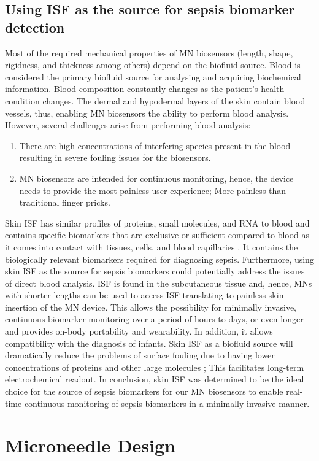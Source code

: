 \begin{appendices}
\subsection{Using ISF as the source for sepsis biomarker detection}
Most of the required mechanical properties of MN biosensors (length, shape, rigidness, and thickness among others) depend on the biofluid source. Blood is considered the primary biofluid source for analysing and acquiring biochemical information. Blood composition constantly changes as the patient’s health condition changes. The dermal and hypodermal layers of the skin contain blood vessels, thus, enabling MN biosensors the ability to perform blood analysis. However, several challenges arise from performing blood analysis: 
\begin{enumerate}
    \item There are high concentrations of interfering species present in the blood resulting in severe fouling issues for the biosensors.
    \item MN biosensors are intended for continuous monitoring, hence, the device needs to provide the most painless user experience; More painless than traditional finger pricks.
\end{enumerate}
Skin ISF has similar profiles of proteins, small molecules, and RNA to blood and contains specific biomarkers that are exclusive or sufficient compared to blood as it comes into contact with tissues, cells, and blood capillaries \cite{liu2020microneedles}. It contains the biologically relevant biomarkers required for diagnosing sepsis. Furthermore, using skin ISF as the source for sepsis biomarkers could potentially address the issues of direct blood analysis. ISF is found in the subcutaneous tissue and, hence, MNs with shorter lengths can be used to access ISF translating to painless skin insertion of the MN device. This allows the possibility for minimally invasive, continuous biomarker monitoring over a period of hours to days, or even longer and provides on-body portability and wearability. In addition, it allows compatibility with the diagnosis of infants. Skin ISF as a biofluid source will dramatically reduce the problems of surface fouling due to having lower concentrations of proteins and other large molecules \cite{heikenfeld2018lab}; This facilitates long-term electrochemical readout. In conclusion, skin ISF was determined to be the ideal choice for the source of sepsis biomarkers for our MN biosensors to enable real-time continuous monitoring of sepsis biomarkers in a minimally invasive manner. 
\section{Microneedle Design}

\end{appendices}
